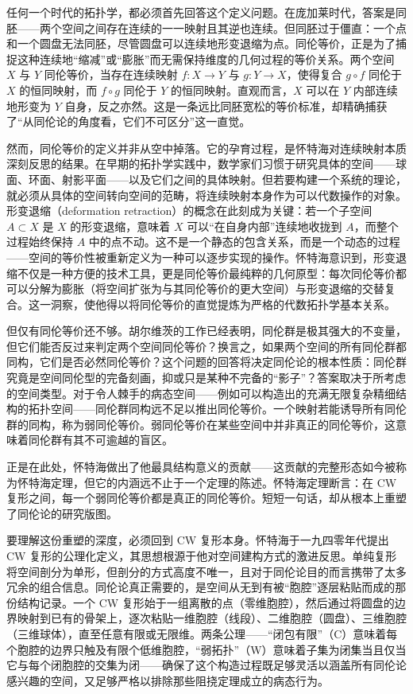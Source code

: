\documentclass[12pt,a4paper]{article}
\begin{document}
任何一个时代的拓扑学，都必须首先回答这个定义问题。在庞加莱时代，答案是同胚——两个空间之间存在连续的一一映射且其逆也连续。但同胚过于僵直：一个点和一个圆盘无法同胚，尽管圆盘可以连续地形变退缩为点。同伦等价，正是为了捕捉这种连续地“缩减”或“膨胀”而无需保持维度的几何过程的等价关系。两个空间 $X$ 与 $Y$ 同伦等价，当存在连续映射 $f:X\to Y$ 与 $g:Y\to X$，使得复合 $g\circ f$ 同伦于 $X$ 的恒同映射，而 $f\circ g$ 同伦于 $Y$ 的恒同映射。直观而言，$X$ 可以在 $Y$ 内部连续地形变为 $Y$ 自身，反之亦然。这是一条远比同胚宽松的等价标准，却精确捕获了“从同伦论的角度看，它们不可区分”这一直觉。

然而，同伦等价的定义并非从空中掉落。它的孕育过程，是怀特海对连续映射本质深刻反思的结果。在早期的拓扑学实践中，数学家们习惯于研究具体的空间——球面、环面、射影平面——以及它们之间的具体映射。但若要构建一个系统的理论，就必须从具体的空间转向空间的范畴，将连续映射本身作为可以代数操作的对象。形变退缩（deformation retraction）的概念在此刻成为关键：若一个子空间 $A\subset X$ 是 $X$ 的形变退缩，意味着 $X$ 可以“在自身内部”连续地收拢到 $A$，而整个过程始终保持 $A$ 中的点不动。这不是一个静态的包含关系，而是一个动态的过程——空间的等价性被重新定义为一种可以逐步实现的操作。怀特海意识到，形变退缩不仅是一种方便的技术工具，更是同伦等价最纯粹的几何原型：每次同伦等价都可以分解为膨胀（将空间扩张为与其同伦等价的更大空间）与形变退缩的交替复合。这一洞察，使他得以将同伦等价的直觉提炼为严格的代数拓扑学基本关系。

但仅有同伦等价还不够。胡尔维茨的工作已经表明，同伦群是极其强大的不变量，但它们能否反过来判定两个空间同伦等价？换言之，如果两个空间的所有同伦群都同构，它们是否必然同伦等价？这个问题的回答将决定同伦论的根本性质：同伦群究竟是空间同伦型的完备刻画，抑或只是某种不完备的“影子”？答案取决于所考虑的空间类型。对于令人棘手的病态空间——例如可以构造出的充满无限复杂精细结构的拓扑空间——同伦群同构远不足以推出同伦等价。一个映射若能诱导所有同伦群的同构，称为弱同伦等价。弱同伦等价在某些空间中并非真正的同伦等价，这意味着同伦群有其不可逾越的盲区。

正是在此处，怀特海做出了他最具结构意义的贡献——这贡献的完整形态如今被称为怀特海定理，但它的内涵远不止于一个定理的陈述。怀特海定理断言：在 CW 复形之间，每一个弱同伦等价都是真正的同伦等价。短短一句话，却从根本上重塑了同伦论的研究版图。

要理解这份重塑的深度，必须回到 CW 复形本身。怀特海于一九四零年代提出 CW 复形的公理化定义，其思想根源于他对空间建构方式的激进反思。单纯复形将空间剖分为单形，但剖分的方式高度不唯一，且对于同伦论目的而言携带了太多冗余的组合信息。同伦论真正需要的，是空间从无到有被“胞腔”逐层粘贴而成的那份结构记录。一个 CW 复形始于一组离散的点（零维胞腔），然后通过将圆盘的边界映射到已有的骨架上，逐次粘贴一维胞腔（线段）、二维胞腔（圆盘）、三维胞腔（三维球体），直至任意有限或无限维。两条公理——“闭包有限”（C）意味着每个胞腔的边界只触及有限个低维胞腔，“弱拓扑”（W）意味着子集为闭集当且仅当它与每个闭胞腔的交集为闭——确保了这个构造过程既足够灵活以涵盖所有同伦论感兴趣的空间，又足够严格以排除那些阻挠定理成立的病态行为。
\end{document}
